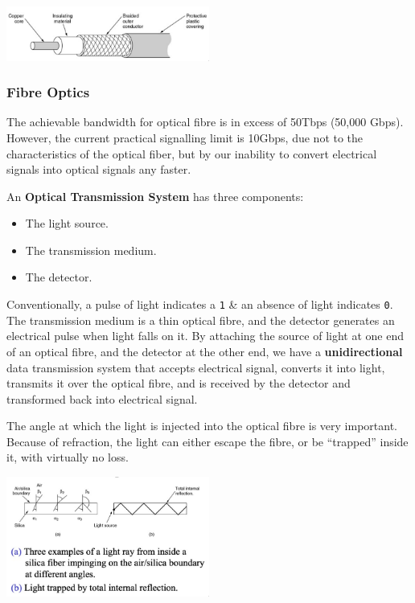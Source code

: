 \documentclass[11pt]{article}
\begin{document}
\begin{center}
    \includegraphics[width=0.5\textwidth]{coax.png}
\end{center}

\subsubsection{Fibre Optics}
The achievable bandwidth for optical fibre is in excess of 50Tbps (50,000 Gbps). 
However, the current practical signalling limit is 10Gbps, due not to the characteristics of the optical fiber, but by our 
inability to convert electrical signals into optical signals any faster. 

An \textbf{Optical Transmission System} has three components:
\begin{itemize}
    \item   The light source. 
    \item   The transmission medium. 
    \item   The detector.
\end{itemize} 

Conventionally, a pulse of light indicates a \verb|1| \& an absence of light indicates \verb|0|. 
The transmission medium is a thin optical fibre, and the detector generates an electrical pulse when light falls on it. 
By attaching the source of light at one end of an optical fibre, and the detector at the other end, we have a 
\textbf{unidirectional} data transmission system that accepts electrical signal, converts it into light, transmits it over 
the optical fibre, and is received by the detector and transformed back into electrical signal. 

The angle at which the light is injected into the optical fibre is very important. 
Because of refraction, the light can either escape the fibre, or be ``trapped'' inside it, with virtually no loss. 

\begin{center}
    \includegraphics[width=0.5\textwidth]{fibopt.png}
\end{center}
\end{document}
